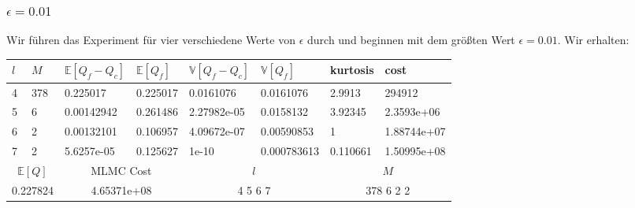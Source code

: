 \subsubsection{$ \epsilon=0.01 $}
Wir führen das Experiment für vier verschiedene Werte von $ \epsilon $ durch und beginnen mit dem größten Wert $ \epsilon=0.01 $. Wir erhalten: 

\newlength\q
\setlength{}
\noindent\begin{tabular}{|p{0.15\q}|p{0.55\q}|p{1.4\q}|p{1.05\q}|p{1.35\q}|p{1.25\q}|p{0.9\q}|p{1.35\q}|}
	\hline
	$ l $   &  $ M $  &  $ \mathbb{E}[Q_f-Q_c] $  &   $ \mathbb{E}[Q_f] $ &  $ \mathbb{V}[Q_f-Q_c] $   &   $ \mathbb{V}[Q_f] $ &  kurtosis    &    cost\\
	\hline
	4 &  378 &   0.225017  &  0.225017 &  0.0161076 &  0.0161076  &    2.9913&      294912 \\
	5 &    6 & 0.00142942  &  0.261486 &2.27982e-05 &  0.0158132  &   3.92345&  2.3593e+06 \\
	6 &    2 & 0.00132101  &  0.106957 &4.09672e-07 & 0.00590853  &         1& 1.88744e+07 \\
	7 &    2 & 5.6257e-05  &  0.125627 &      1e-10 &0.000783613  &  0.110661& 1.50995e+08 \\
	\hline
	\multicolumn{2}{|c|}{$ \mathbb{E}[Q] $ }  &  \multicolumn{2}{c|}{MLMC Cost}   & \multicolumn{2}{c|}{$ l $}  &    \multicolumn{2}{c|}{$ M$} \\
	\hline
	\multicolumn{2}{|c|}{0.227824} & \multicolumn{2}{c|}{4.65371e+08  } &  \multicolumn{2}{c|}{   4 5 6 7}     & \multicolumn{2}{c|}{  378 6 2 2}    \\
	\hline 
\end{tabular}\\

